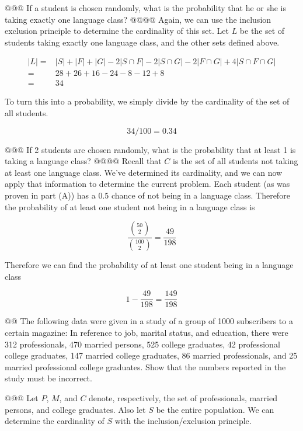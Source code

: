 \documentclass[10pt]{article}
\begin{document}
\begin{easylist}[enumerate]
    @@@ If a student is chosen randomly, what is the probability that he or she is taking exactly one language class?
    @@@@ Again, we can use the inclusion exclusion principle to determine the cardinality of this set. Let $L$ be the set of students taking exactly one language class, and the other sets defined above.

        \[ \begin{aligned}
            |L| =& |S| + |F| + |G| - 2|S \cap F| - 2|S \cap G| - 2|F \cap G| + 4|S \cap F \cap G|\\
                =& 28 + 26 + 16 - 24 - 8 - 12 + 8\\
                =& 34
        \end{aligned} \]

        To turn this into a probability, we simply divide by the cardinality of the set of all students.

        \[ 34/100 = \boxed{0.34} \]

    @@@ If 2 students are chosen randomly, what is the probability that at least 1 is taking a language class?
    @@@@ Recall that $C$ is the set of all students not taking at least one language class. We've determined its cardinality, and we can now apply that information to determine the current problem. Each student (as was proven in part (A)) has a $0.5$ chance of not being in a language class. Therefore the probability of at least one student not being in a language class is

        \[ \frac{\binom{50}{2} }{\binom{100}{2} } = \frac{49}{198} \]

    Therefore we can find the probability of at least one student being in a language class

        \[ 1 - \frac{49}{198} = \boxed{\frac{149}{198} } \]

    @@ The following data were given in a study of a group of 1000 subscribers to a certain magazine: In reference to job, marital status, and education, there were 312 professionals, 470 married persons, 525 college graduates, 42 professional college graduates, 147 married college graduates, 86 married professionals, and 25 married professional college graduates. Show that the numbers reported in the study must be incorrect.\newline

    @@@ Let $P$, $M$, and $C$ denote, respectively, the set of professionals, married persons, and college graduates. Also let $S$ be the entire population. We can determine the cardinality of $S$ with the inclusion/exclusion principle.


\end{easylist}
\end{document}
